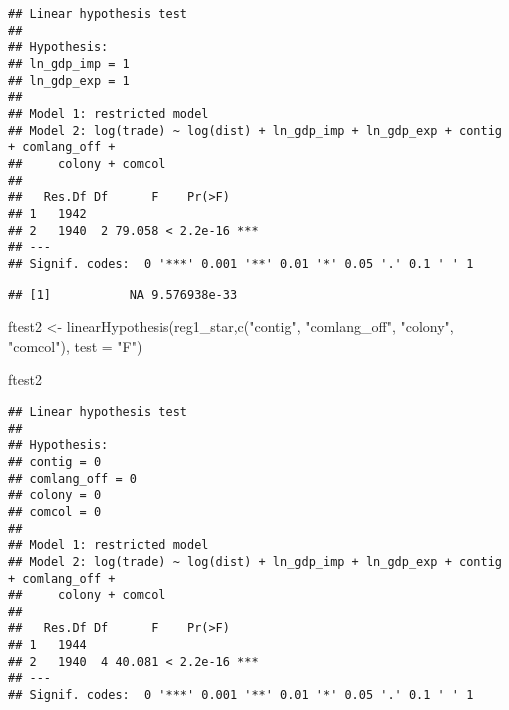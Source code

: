 \documentclass[
]{article}
\newenvironment{Shaded}{\begin{snugshade}}{\end{snugshade}}
\newcommand{\AttributeTok}[1]{\textcolor[rgb]{0.77,0.63,0.00}{#1}}
\newcommand{\ConstantTok}[1]{\textcolor[rgb]{0.00,0.00,0.00}{#1}}
\newcommand{\DecValTok}[1]{\textcolor[rgb]{0.00,0.00,0.81}{#1}}
\newcommand{\FunctionTok}[1]{\textcolor[rgb]{0.00,0.00,0.00}{#1}}
\newcommand{\NormalTok}[1]{#1}
\newcommand{\OtherTok}[1]{\textcolor[rgb]{0.56,0.35,0.01}{#1}}
\newcommand{\SpecialCharTok}[1]{\textcolor[rgb]{0.00,0.00,0.00}{#1}}
\newcommand{\StringTok}[1]{\textcolor[rgb]{0.31,0.60,0.02}{#1}}
\begin{document}
\begin{verbatim}
## Linear hypothesis test
## 
## Hypothesis:
## ln_gdp_imp = 1
## ln_gdp_exp = 1
## 
## Model 1: restricted model
## Model 2: log(trade) ~ log(dist) + ln_gdp_imp + ln_gdp_exp + contig + comlang_off + 
##     colony + comcol
## 
##   Res.Df Df      F    Pr(>F)    
## 1   1942                        
## 2   1940  2 79.058 < 2.2e-16 ***
## ---
## Signif. codes:  0 '***' 0.001 '**' 0.01 '*' 0.05 '.' 0.1 ' ' 1
\end{verbatim}

\begin{Shaded}
\end{Shaded}

\begin{verbatim}
## [1]           NA 9.576938e-33
\end{verbatim}

\begin{Shaded}
\begin{Highlighting}[]
\NormalTok{ftest2 }\OtherTok{\textless{}{-}} \FunctionTok{linearHypothesis}\NormalTok{(reg1\_star,}\FunctionTok{c}\NormalTok{(}\StringTok{"contig"}\NormalTok{, }\StringTok{"comlang\_off"}\NormalTok{, }\StringTok{"colony"}\NormalTok{,}
\StringTok{"comcol"}\NormalTok{), }\AttributeTok{test =} \StringTok{"F"}\NormalTok{)}

\NormalTok{ftest2}
\end{Highlighting}
\end{Shaded}

\begin{verbatim}
## Linear hypothesis test
## 
## Hypothesis:
## contig = 0
## comlang_off = 0
## colony = 0
## comcol = 0
## 
## Model 1: restricted model
## Model 2: log(trade) ~ log(dist) + ln_gdp_imp + ln_gdp_exp + contig + comlang_off + 
##     colony + comcol
## 
##   Res.Df Df      F    Pr(>F)    
## 1   1944                        
## 2   1940  4 40.081 < 2.2e-16 ***
## ---
## Signif. codes:  0 '***' 0.001 '**' 0.01 '*' 0.05 '.' 0.1 ' ' 1
\end{verbatim}

\begin{Shaded}
\end{Shaded}
\end{document}
